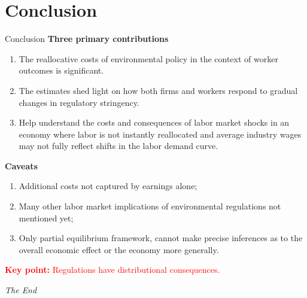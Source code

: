 \documentclass{beamer}
\begin{document}
\section{Conclusion}
\begin{frame}[shrink]
	\transfade %
	\tableofcontents[sectionstyle=show/shaded,subsectionstyle=show/shaded/hide]
	\addtocounter{framenumber}{-1}
\end{frame}
\begin{frame}{Conclusion}
	\textbf{Three primary contributions}
	\begin{enumerate}
		\item The reallocative costs of environmental policy in the context of worker outcomes is significant.
		\item The estimates shed light on how both firms and workers respond to gradual changes in regulatory stringency.
		\item Help understand the costs and consequences of labor market shocks in an economy where labor is not instantly reallocated and average industry wages may not fully reflect shifts in the labor demand curve.
	\end{enumerate}
	\textbf{Caveats}
	\begin{enumerate}
		\item Additional costs not captured by earnings alone;
		\item Many other labor market implications of environmental regulations not mentioned yet;
		\item Only partial equilibrium framework, cannot make precise inferences as to the overall economic effect or the economy more generally.
	\end{enumerate}
	\textcolor{red}{\textbf{Key point:} Regulations have distributional consequences.}
\end{frame}

\begin{frame}
\Huge{\centerline{\textit{The End}}}
\end{frame}
\end{document}

